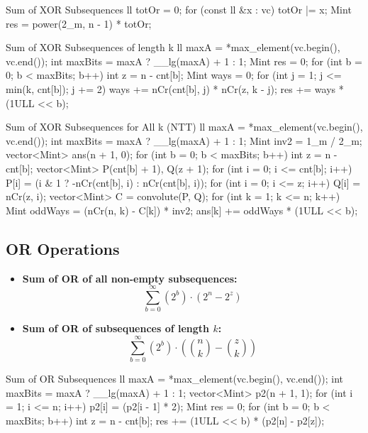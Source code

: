 \documentclass[10pt]{article}
\newcommand{\complexity}[1]{%
  \tcbox[on line,
    colback=tagbg,
    colframe=tagbg,
    boxrule=0pt,
    arc=2pt,
    boxsep=0pt,
    left=3.5pt, right=3.5pt, top=1.5pt, bottom=1.5pt
  ]{\color{tagtext}\scriptsize\bfseries\ensuremath{#1}}%
}
\begin{document}
\begin{vscode}{Sum of XOR Subsequences \complexity{O(N)}}
ll totOr = 0;
for (const ll &x : vc) 
    totOr |= x;
Mint res = power(2_m, n - 1) * totOr;
\end{vscode}

\begin{vscode}{Sum of XOR Subsequences of length k \complexity{O(N \log(\max A))}}
ll maxA = *max_element(vc.begin(), vc.end());
int maxBits = maxA ? __lg(maxA) + 1 : 1;
Mint res = 0;
for (int b = 0; b < maxBits; b++) 
{
    int z = n - cnt[b];
    Mint ways = 0;
    for (int j = 1; j <= min(k, cnt[b]); j += 2) 
        ways += nCr(cnt[b], j) * nCr(z, k - j);
    res += ways * (1ULL << b);
}
\end{vscode}

\begin{vscode}{Sum of XOR Subsequences for All k (NTT) \complexity{O(N \log N \log(\max A))}}
ll maxA = *max_element(vc.begin(), vc.end());
int maxBits = maxA ? __lg(maxA) + 1 : 1;
Mint inv2 = 1_m / 2_m;
vector<Mint> ans(n + 1, 0);
for (int b = 0; b < maxBits; b++) 
{
    int z = n - cnt[b];
    vector<Mint> P(cnt[b] + 1), Q(z + 1);
    for (int i = 0; i <= cnt[b]; i++) 
        P[i] = (i & 1 ? -nCr(cnt[b], i) : nCr(cnt[b], i));
    for (int i = 0; i <= z; i++) Q[i] = nCr(z, i);
    vector<Mint> C = convolute(P, Q);
    for (int k = 1; k <= n; k++) 
    {
        Mint oddWays = (nCr(n, k) - C[k]) * inv2;
        ans[k] += oddWays * (1ULL << b);
    }
}
\end{vscode}

\newpage
\subsection{OR Operations}
\begin{itemize}
    \item \textbf{Sum of OR of all non-empty subsequences:}
          \[ \sum_{b = 0}^{\infty} (2^b) \cdot (2^n - 2^{z}) \]
    \item \textbf{Sum of OR of subsequences of length $k$:}
          \[ \sum_{b = 0}^{\infty} (2^b) \cdot \left( \binom{n}{k} - \binom{z}{k} \right) \]
\end{itemize}

\begin{vscode}{Sum of OR Subsequences \complexity{O(N \log(\max A))}}
ll maxA = *max_element(vc.begin(), vc.end());
int maxBits = maxA ? __lg(maxA) + 1 : 1;
vector<Mint> p2(n + 1, 1);
for (int i = 1; i <= n; i++) 
    p2[i] = (p2[i - 1] * 2);
Mint res = 0;
for (int b = 0; b < maxBits; b++) 
{
    int z = n - cnt[b];
    res += (1ULL << b) * (p2[n] - p2[z]);
}
\end{vscode}
\end{document}
